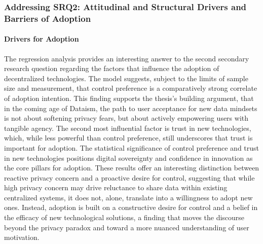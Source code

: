 	\subsubsection{Addressing SRQ2: Attitudinal and Structural Drivers and Barriers of Adoption}

	\paragraph{Drivers for Adoption}
	The regression analysis provides an interesting answer to the second secondary research question regarding the factors that influence the adoption of decentralized technologies. The model suggests, subject to the limits of sample size and measurement, that control preference is a comparatively strong correlate of adoption intention. This finding supports the thesis's building argument, that in the coming age of Dataism, the path to user acceptance for new data mindsets is not about softening privacy fears, but about actively empowering users with tangible agency. The second most influential factor is trust in new technologies, which, while less powerful than control preference, still underscores that trust is important for adoption. The statistical significance of control preference and trust in new technologies positions digital sovereignty and confidence in innovation as the core pillars for adoption. These results offer an interesting distinction between reactive privacy concern and a proactive desire for control, suggesting that while high privacy concern may drive reluctance to share data within existing centralized systems, it does not, alone, translate into a willingness to adopt new ones. Instead, adoption is built on a constructive desire for control and a belief in the efficacy of new technological solutions, a finding that moves the discourse beyond the privacy paradox and toward a more nuanced understanding of user motivation.

